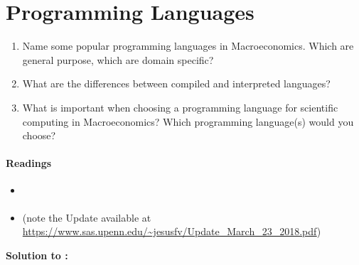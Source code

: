 \section[Programming Languages]{Programming Languages\label{ex:ProgrammingLanguages}}
\begin{enumerate}
	\item Name some popular programming languages in Macroeconomics.
	Which are general purpose, which are domain specific?
	\item What are the differences between compiled and interpreted languages?
	\item What is important when choosing a programming language for scientific computing in Macroeconomics?
	Which programming language(s) would you choose?
\end{enumerate}

\paragraph{Readings} 
\begin{itemize}
	\item \textcite{Aguirre.Danielsson_2020_WhichProgrammingLanguage}
	\item \textcite{Aruoba.Fernandez-Villaverde_2015_ComparisonProgrammingLanguages} (note the Update available at \url{https://www.sas.upenn.edu/~jesusfv/Update_March_23_2018.pdf})	
\end{itemize}

\begin{solution}\textbf{Solution to :}
\ifDisplaySolutions

\fi
\newpage
\end{solution}